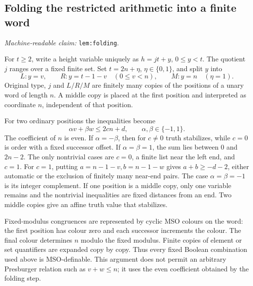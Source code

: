 \documentclass[11pt]{amsart}
\newcommand{\record}[1]{\nolinkurl{#1}}
\newcommand{\claimid}[1]{\par\nopagebreak\noindent\textit{Machine-readable claim:} \record{#1}.\par}
\theoremstyle{definition}\newtheorem{definition}{Definition}
\begin{document}
\subsection{Folding the restricted arithmetic into a finite word}\label{lem:folding}
\claimid{lem:folding}
For $t\ge2$, write a height variable uniquely as $h=jt+y$, $0\le y<t$.
The quotient $j$ ranges over a fixed finite set. Set $t=2n+\eta$,
$\eta\in\{0,1\}$, and split $y$ into
\begin{equation}\label{eq:fold}
 L:y=v,\qquad R:y=t-1-v\quad(0\le v<n),\qquad
 M:y=n\quad(\eta=1).
\end{equation}
Original type, $j$ and $L/R/M$ are finitely many copies of the positions
of a unary word of length $n$. A middle copy is placed at the first
position and interpreted as coordinate $n$, independent of that position.

For two ordinary positions the inequalities become
\[
 \alpha v+\beta w\le 2cn+d,\qquad \alpha,\beta\in\{-1,1\}.
\]
The coefficient of $n$ is even. If $\alpha=-\beta$, then for $c\ne0$
truth stabilizes, while $c=0$ is order with a fixed successor offset.
If $\alpha=\beta=1$, the sum lies between 0 and $2n-2$. The only
nontrivial cases are $c=0$, a finite list near the left end, and $c=1$.
For $c=1$, putting $a=n-1-v,b=n-1-w$ gives
$a+b\ge-d-2$, either automatic or the exclusion of finitely many
near-end pairs. The case $\alpha=\beta=-1$ is its integer complement.
If one position is a middle copy, only one variable remains and the
nontrivial inequalities are fixed distances from an end. Two middle
copies give an affine truth value that stabilizes.

Fixed-modulus congruences are represented by cyclic MSO colours on
the word: the first position has colour zero and each successor
increments the colour. The final colour determines $n$ modulo the
fixed modulus. Finite copies of element or set quantifiers are expanded
copy by copy. Thus every fixed Boolean combination used above is
MSO-definable. This argument does not permit an arbitrary Presburger
relation such as $v+w\le n$; it uses the even coefficient obtained by
the folding step.
\end{document}
